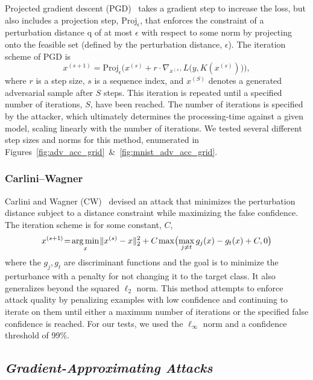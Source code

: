 \documentclass[journal]{IEEEtran}
\DeclareMathOperator*{\argmin}{arg\,min}
\newcommand{\cm}[1]{\textit{{\color{blue}#1}}}
\begin{document}
Projected gradient descent (PGD)~\cite{carlini_towards_2017} takes a gradient step to increase the loss, but also includes a projection step, $\mathrm{Proj}_\epsilon$, that enforces the constraint of a perturbation distance q of at most $\epsilon$ with respect to some norm by projecting onto the feasible set (defined by the perturbation distance, $\epsilon$). The iteration scheme of PGD is
$$
    x^{(s+1)} = \mathrm{Proj}_\epsilon \Big( x^{(s)} + r \cdot \nabla_{x^{(s)}} L\big(y, K(x^{(s)})\big) \Big),
$$
where $r$ is a step size, $s$ is a sequence index, and $x^{(S)}$ denotes a generated adversarial sample after $S$ steps. This iteration is repeated until a specified number of iterations, $S$, have been reached. The number of iterations is specified by the attacker, which ultimately determines the processing-time against a given model, scaling linearly with the number of iterations. We tested several different step sizes and norms for this method, enumerated in Figures~\ref{fig:adv_acc_grid}~\&~\ref{fig:mnist_adv_acc_grid}. 

\subsubsection{Carlini--Wagner}

Carlini and Wagner (CW)~\cite{carlini_towards_2017} devised an attack that minimizes the perturbation distance subject to a distance constraint while maximizing the false confidence.
The iteration scheme is for some constant, $C$,
$$
    x^{(s+1\hspace{-0.025em})}\hspace{-0.2em}=\hspace{-0.15em}\argmin_x \hspace{-0.1em} \|x^{(s)} - x\|_2^2 + C \hspace{-0.05em} \max\hspace{-0.15em}\big(\hspace{-0.15em}\max_{j\neq t} g_j(x) - g_t(x) + C, 0\big)
$$
where the $g_j, g_t$ are discriminant functions and the goal is to minimize the perturbance with a penalty for not changing it to the target class. It also generalizes beyond the squared $\ell_2$ norm. This method attempts to enforce attack quality by penalizing examples with low confidence and continuing to iterate on them until either a maximum number of iterations or the specified false confidence is reached. For our tests, we used the $\ell_{\infty}$ norm and a confidence threshold of 99\%. 

\subsection{\cm{Gradient-Approximating Attacks}}
\end{document}
